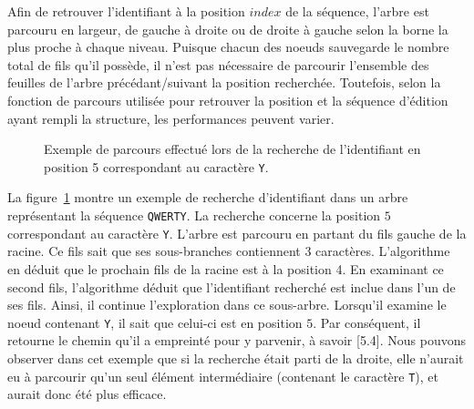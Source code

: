 
%       


Afin de retrouver l'identifiant à la position $index$ de la séquence, l'arbre
est parcouru en largeur, de gauche à droite ou de droite à gauche selon la borne
la plus proche à chaque niveau.  Puisque chacun des noeuds sauvegarde le nombre
total de fils qu'il possède, il n'est pas nécessaire de parcourir l'ensemble des
feuilles de l'arbre précédant/suivant la position recherchée. Toutefois, selon
la fonction de parcours utilisée pour retrouver la position et la séquence
d'édition ayant rempli la structure, les performances peuvent varier.

\begin{figure}
  \centering
  
  \caption{\label{repl:fig:getexample} Exemple de parcours effectué lors de la
    recherche de l'identifiant en position 5 correspondant au caractère
    \texttt{Y}.}
\end{figure}

La figure~\ref{repl:fig:getexample} montre un exemple de recherche d'identifiant
dans un arbre représentant la séquence \texttt{QWERTY}. La recherche concerne la
position $5$ correspondant au caractère \texttt{Y}. L'arbre est parcouru en
partant du fils gauche de la racine. Ce fils sait que ses sous-branches
contiennent 3 caractères. L'algorithme en déduit que le prochain fils de la
racine est à la position 4. En examinant ce second fils, l'algorithme déduit que
l'identifiant recherché est inclue dans l'un de ses fils. Ainsi, il continue
l'exploration dans ce sous-arbre. Lorsqu'il examine le noeud contenant
\texttt{Y}, il sait que celui-ci est en position $5$. Par conséquent, il
retourne le chemin qu'il a empreinté pour y parvenir, à savoir [5.4]. Nous
pouvons observer dans cet exemple que si la recherche était parti de la droite,
elle n'aurait eu à parcourir qu'un seul élément intermédiaire (contenant le
caractère \texttt{T}), et aurait donc été plus efficace.

